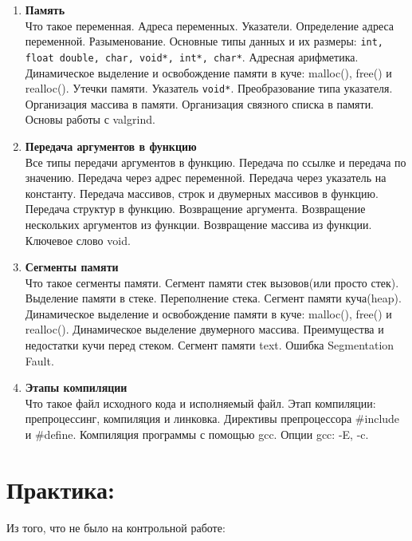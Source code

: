 \documentclass{article}
\begin{document}
\begin{enumerate}
\item \textbf{Память}\\
Что такое переменная. Адреса переменных. Указатели. Определение адреса переменной. Разыменование. Основные типы данных и их размеры: \texttt{int, float double, char, void*, int*, char*}. Адресная арифметика. Динамическое выделение и освобождение памяти в куче: malloc(), free() и realloc(). Утечки памяти. Указатель \texttt{void*}. Преобразование типа указателя. Организация массива в памяти. Организация связного списка в памяти. Основы работы с valgrind.\\

\item \textbf{Передача аргументов в функцию}\\
Все типы передачи аргументов в функцию. Передача по ссылке и передача по значению. Передача через адрес переменной. Передача через указатель на константу. Передача массивов, строк и двумерных массивов в функцию. Передача структур в функцию. Возвращение аргумента. Возвращение нескольких аргументов из функции. Возвращение массива из функции. Ключевое слово void.\\

\item \textbf{Сегменты памяти}\\
Что такое сегменты памяти. Сегмент памяти стек вызовов(или просто стек). Выделение памяти в стеке. Переполнение стека. Сегмент памяти куча(heap). Динамическое выделение и освобождение памяти в куче: malloc(), free() и realloc(). Динамическое выделение двумерного массива. Преимущества и недостатки кучи перед стеком. Сегмент памяти text. Ошибка Segmentation Fault.\\

\item \textbf{Этапы компиляции}\\
Что такое файл исходного кода и исполняемый файл. Этап компиляции: препроцессинг, компиляция и линковка. Директивы препроцессора \#include и \#define. Компиляция программы с помощью gcc. Опции gcc: -E, -c.

\end{enumerate}



\newpage
\section*{Практика:}
Из того, что не было на контрольной работе:
\end{document}
